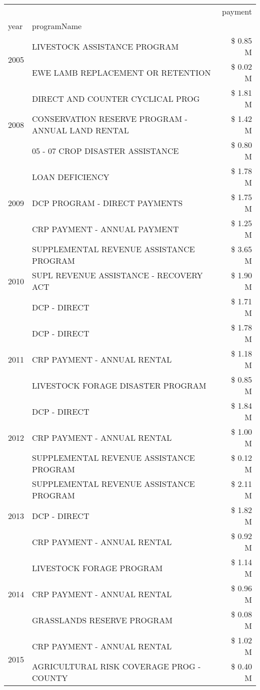 \begin{tabular}{llr}
\toprule
 &  & payment \\
year & programName &  \\
\midrule
\multirow[t]{2}{*}{2005} & LIVESTOCK ASSISTANCE PROGRAM & \$ 0.85 M \\
 & EWE LAMB REPLACEMENT OR RETENTION & \$ 0.02 M \\
\cline{1-3}
\multirow[t]{3}{*}{2008} & DIRECT AND COUNTER CYCLICAL PROG & \$ 1.81 M \\
 & CONSERVATION RESERVE PROGRAM - ANNUAL LAND RENTAL & \$ 1.42 M \\
 & 05 - 07 CROP DISASTER ASSISTANCE & \$ 0.80 M \\
\cline{1-3}
\multirow[t]{3}{*}{2009} & LOAN DEFICIENCY & \$ 1.78 M \\
 & DCP PROGRAM - DIRECT PAYMENTS & \$ 1.75 M \\
 & CRP PAYMENT - ANNUAL PAYMENT & \$ 1.25 M \\
\cline{1-3}
\multirow[t]{3}{*}{2010} & SUPPLEMENTAL REVENUE ASSISTANCE PROGRAM & \$ 3.65 M \\
 & SUPL REVENUE ASSISTANCE - RECOVERY ACT & \$ 1.90 M \\
 & DCP - DIRECT & \$ 1.71 M \\
\cline{1-3}
\multirow[t]{3}{*}{2011} & DCP - DIRECT & \$ 1.78 M \\
 & CRP PAYMENT - ANNUAL RENTAL & \$ 1.18 M \\
 & LIVESTOCK FORAGE DISASTER PROGRAM & \$ 0.85 M \\
\cline{1-3}
\multirow[t]{3}{*}{2012} & DCP - DIRECT & \$ 1.84 M \\
 & CRP PAYMENT - ANNUAL RENTAL & \$ 1.00 M \\
 & SUPPLEMENTAL REVENUE ASSISTANCE PROGRAM & \$ 0.12 M \\
\cline{1-3}
\multirow[t]{3}{*}{2013} & SUPPLEMENTAL REVENUE ASSISTANCE PROGRAM & \$ 2.11 M \\
 & DCP - DIRECT & \$ 1.82 M \\
 & CRP PAYMENT - ANNUAL RENTAL & \$ 0.92 M \\
\cline{1-3}
\multirow[t]{3}{*}{2014} & LIVESTOCK FORAGE PROGRAM & \$ 1.14 M \\
 & CRP PAYMENT - ANNUAL RENTAL & \$ 0.96 M \\
 & GRASSLANDS RESERVE PROGRAM & \$ 0.08 M \\
\cline{1-3}
\multirow[t]{3}{*}{2015} & CRP PAYMENT - ANNUAL RENTAL & \$ 1.02 M \\
 & AGRICULTURAL RISK COVERAGE PROG - COUNTY & \$ 0.40 M \\

\end{tabular}

